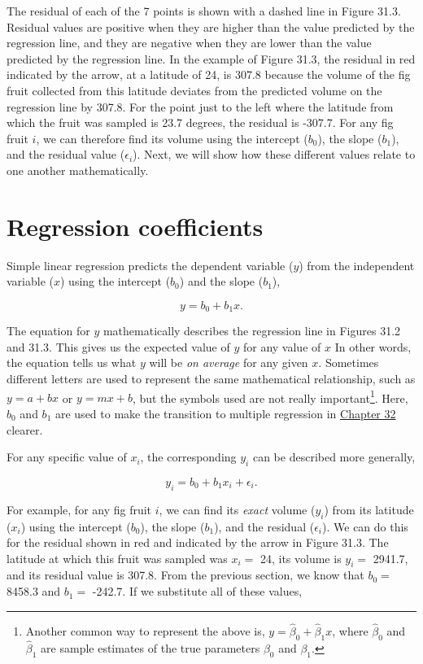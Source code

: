 \documentclass[
]{scrbook}
\begin{document}
The residual of each of the 7 points is shown with a dashed line in Figure 31.3.
Residual values are positive when they are higher than the value predicted by the regression line, and they are negative when they are lower than the value predicted by the regression line.
In the example of Figure 31.3, the residual in red indicated by the arrow, at a latitude of 24, is 307.8 because the volume of the fig fruit collected from this latitude deviates from the predicted volume on the regression line by 307.8.
For the point just to the left where the latitude from which the fruit was sampled is 23.7 degrees, the residual is -307.7.
For any fig fruit \(i\), we can therefore find its volume using the intercept (\(b_{0}\)), the slope (\(b_{1}\)), and the residual value (\(\epsilon_{i}\)).
Next, we will show how these different values relate to one another mathematically.

\hypertarget{regression-coefficients}{%
\section{Regression coefficients}\label{regression-coefficients}}

Simple linear regression predicts the dependent variable (\(y\)) from the independent variable (\(x\)) using the intercept (\(b_{0}\)) and the slope (\(b_{1}\)),

\[y = b_{0} + b_{1}x.\]

The equation for \(y\) mathematically describes the regression line in Figures 31.2 and 31.3.
This gives us the expected value of \(y\) for any value of \(x\)
In other words, the equation tells us what \(y\) will be \emph{on average} for any given \(x\).
Sometimes different letters are used to represent the same mathematical relationship, such as \(y = a + bx\) or \(y = mx + b\), but the symbols used are not really important\footnote{Another common way to represent the above is, \(y = \hat{\beta}_{0} + \hat{\beta}_{1}x\), where \(\hat{\beta}_{0}\) and \(\hat{\beta}_{1}\) are sample estimates of the true parameters \({\beta}_{0}\) and \({\beta}_{1}\).}.
Here, \(b_{0}\) and \(b_{1}\) are used to make the transition to multiple regression in \protect\hyperlink{Chapter_32}{Chapter 32} clearer.

For any specific value of \(x_{i}\), the corresponding \(y_{i}\) can be described more generally,

\[y_{i} = b_{0} + b_{1}x_{i} + \epsilon_{i}.\]

For example, for any fig fruit \(i\), we can find its \emph{exact} volume (\(y_{i}\)) from its latitude (\(x_{i}\)) using the intercept (\(b_{0}\)), the slope (\(b_{1}\)), and the residual (\(\epsilon_{i}\)).
We can do this for the residual shown in red and indicated by the arrow in Figure 31.3.
The latitude at which this fruit was sampled was \(x_{i} =\) 24, its volume is \(y_{i} =\) 2941.7, and its residual value is 307.8.
From the previous section, we know that \(b_{0} =\) 8458.3 and \(b_{1} =\) -242.7.
If we substitute all of these values,
\end{document}
